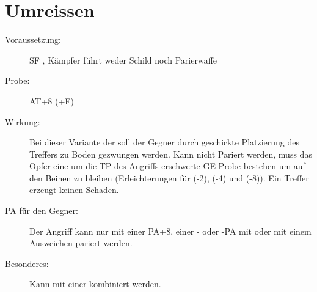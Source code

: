 \section{Umreissen}
\label{aktion.umreissen}
\begin{description}
    \item[Voraussetzung:]
        SF , Kämpfer führt weder Schild noch Parierwaffe
    \item[Probe:]
        AT+8 (+F)
    \item[Wirkung:]
        Bei dieser Variante der  soll der Gegner durch geschickte Platzierung des Treffers zu Boden gezwungen werden.
        Kann nicht Pariert werden, muss das Opfer eine um die TP des Angriffs erschwerte GE Probe bestehen um auf den Beinen zu bleiben (Erleichterungen für  (-2),  (-4) und  (-8)).
        Ein Treffer erzeugt keinen Schaden.
    \item[PA für den Gegner:]
        Der Angriff kann nur mit einer PA+8, einer - oder -PA mit  oder mit einem Ausweichen pariert werden.
    \item[Besonderes:]
        Kann mit einer  kombiniert werden.
\end{description}
